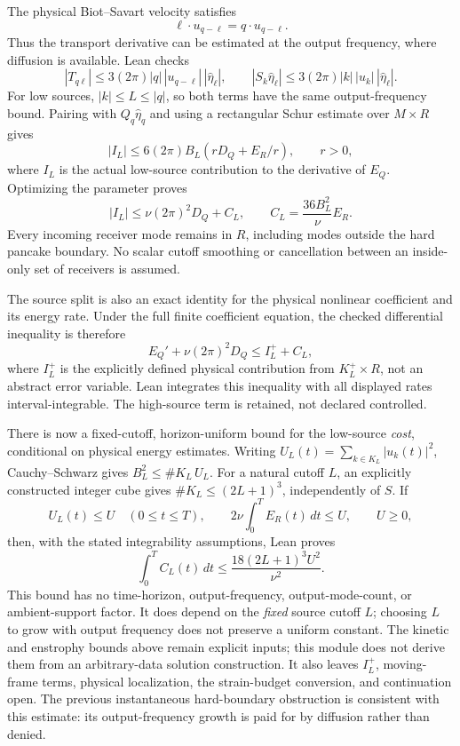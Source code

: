 \documentclass[11pt]{article}
\theoremstyle{definition}
\begin{document}
The physical Biot--Savart velocity satisfies
\[
 \ell\cdot u_{q-\ell}=q\cdot u_{q-\ell}.
\]
Thus the transport derivative can be estimated at the output frequency,
where diffusion is available.  Lean checks
\[
 |T_{q\ell}|\le3(2\pi)|q|\,|u_{q-\ell}|\,|\widehat\eta_\ell|,
 \qquad
 |S_k\widehat\eta_\ell|
   \le3(2\pi)|k|\,|u_k|\,|\widehat\eta_\ell|.
\]
For low sources, $|k|\le L\le|q|$, so both terms have the same
output-frequency bound.  Pairing with $Q_q\widehat\eta_q$ and using a
rectangular Schur estimate over $M\times R$ gives
\[
 |I_L|\le6(2\pi)B_L(rD_Q+E_R/r),\qquad r>0,
\]
where $I_L$ is the actual low-source contribution to the derivative of
$E_Q$.  Optimizing the parameter proves
\[
 |I_L|\le\nu(2\pi)^2D_Q+C_L,
 \qquad C_L=\frac{36B_L^2}{\nu}E_R.
\]
Every incoming receiver mode remains in $R$, including modes outside the
hard pancake boundary.  No scalar cutoff smoothing or cancellation between
an inside-only set of receivers is assumed.

The source split is also an exact identity for the physical nonlinear
coefficient and its energy rate.  Under the full finite coefficient
equation, the checked differential inequality is therefore
\begin{equation}\label{eq:ns-incoming-low-source}
 E_Q'+\nu(2\pi)^2D_Q\le I_L^+ + C_L,
\end{equation}
where $I_L^+$ is the explicitly defined physical contribution from
$K_L^+\times R$, not an abstract error variable.  Lean integrates this
inequality with all displayed rates interval-integrable.  The high-source
term is retained, not declared controlled.

There is now a fixed-cutoff, horizon-uniform bound for the low-source
\emph{cost}, conditional on physical energy estimates.  Writing
$U_L(t)=\sum_{k\in K_L}|u_k(t)|^2$, Cauchy--Schwarz gives
$B_L^2\le\#K_L\,U_L$.  For a natural cutoff $L$, an explicitly constructed
integer cube gives $\#K_L\le(2L+1)^3$, independently of $S$.  If
\[
 U_L(t)\le U\quad(0\le t\le T),\qquad
 2\nu\int_0^T E_R(t)\,dt\le U,\qquad U\ge0,
\]
then, with the stated integrability assumptions, Lean proves
\begin{equation}\label{eq:ns-incoming-fixed-cutoff-budget}
 \int_0^T C_L(t)\,dt\le
   \frac{18(2L+1)^3U^2}{\nu^2}.
\end{equation}
This bound has no time-horizon, output-frequency, output-mode-count, or
ambient-support factor.  It does depend on the \emph{fixed} source cutoff
$L$; choosing $L$ to grow with output frequency does not preserve a uniform
constant.  The kinetic and enstrophy bounds above remain explicit inputs;
this module does not derive them from an arbitrary-data solution
construction.  It also leaves $I_L^+$, moving-frame terms, physical
localization, the strain-budget conversion, and continuation open.  The
previous instantaneous hard-boundary obstruction is consistent with this
estimate: its output-frequency growth is paid for by diffusion rather than
denied.
\end{document}
